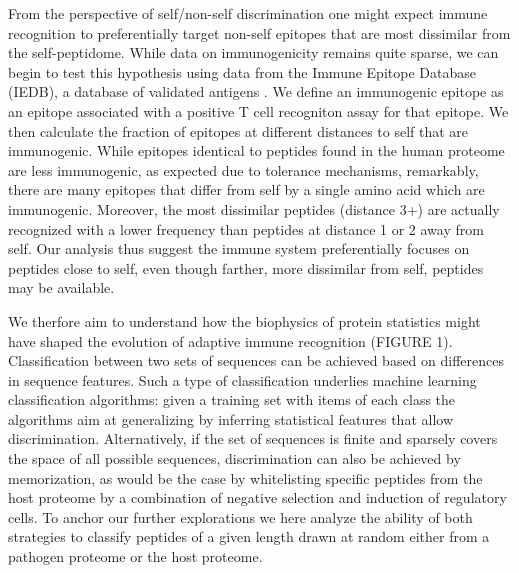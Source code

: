 \documentclass[superscriptaddress,twocolumn,pre]{revtex4}
\newcommand{\<}{\langle}
\renewcommand{\>}{\rangle}
\begin{document}
From the perspective of self/non-self discrimination one might expect immune recognition to preferentially target non-self epitopes that are most dissimilar from the self-peptidome. While data on immunogenicity remains quite sparse, we can begin to test this hypothesis using data from the Immune Epitope Database (IEDB), a database of validated antigens \cite{Vita2019}. We define an immunogenic epitope as an epitope associated with a positive T cell recogniton assay for that epitope. We then calculate the fraction of epitopes at different distances to self that are immunogenic. While epitopes identical to peptides found in the human proteome are less immunogenic, as expected due to tolerance mechanisms, remarkably, there are many epitopes that differ from self by a single amino acid which are immunogenic. Moreover, the most dissimilar peptides (distance 3+) are actually recognized with a lower frequency than peptides at distance 1 or 2 away from self. Our analysis thus suggest the immune system preferentially focuses on peptides close to self, even though farther, more dissimilar from self,  peptides may be available.


We therfore aim to understand how the biophysics of protein statistics might have shaped the evolution of adaptive immune recognition (FIGURE 1). Classification between two sets of sequences can be achieved based on differences in sequence features. Such a type of classification underlies machine learning classification algorithms: given a training set with items of each class the algorithms aim at generalizing by inferring statistical features that allow discrimination. Alternatively, if the set of sequences is finite and sparsely covers the space of all possible sequences, discrimination can also be achieved by memorization, as would be the case by whitelisting specific peptides from the host proteome by a combination of negative selection and induction of regulatory cells. To anchor our further explorations we here analyze the ability of both strategies to classify peptides of a given length drawn at random either from a pathogen proteome or the host proteome.
\end{document}
